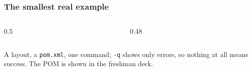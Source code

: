 \documentclass[aspectratio=169,10pt,compress]{beamer}
\begin{document}
\begin{frame}[t,fragile] \frametitle{The smallest real example}
  \begin{columns}[T]
    \begin{column}{0.5\textwidth}
    \end{column}
    \begin{column}{0.48\textwidth}
    \end{column}
  \end{columns}

  \vspace{0.1em}
  \small
  A layout, a \texttt{pom.xml}, one command; \texttt{-q} shows only errors, so nothing at all means success. The POM is shown in the freshman deck.
\end{frame}

\end{document}
